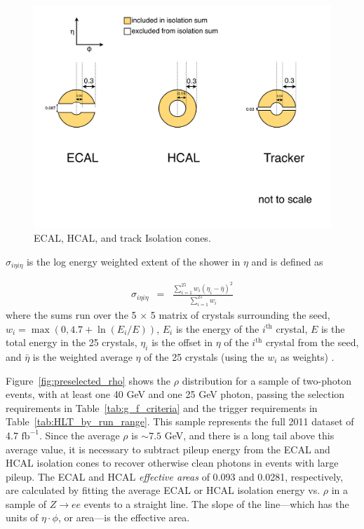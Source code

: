 \documentclass[dissertation.tex]{subfiles}
\begin{document}
\begin{figure}
	\centering
	\includegraphics[scale=0.3]{isolation_cones}
	\caption{ECAL, HCAL, and track Isolation cones.}
	\label{fig:isolation_cones}
\end{figure}

$\sigma_{i\eta i\eta}$ is the log energy weighted extent of the shower in $\eta$ and is defined as

\begin{eqnarray}
\sigma_{i\eta i\eta} &=& \frac{\sum_{i = 1}^{25}w_{i}(\eta_{i} - \bar{\eta})^{2}}{\sum_{i = 1}^{25}w_{i}}
\end{eqnarray}
%
where the sums run over the 5 $\times$ 5 matrix of crystals surrounding the seed, $w_{i} = \max(0, 4.7 + \ln(E_{i}/E))$, $E_{i}$ is the energy of the $i^{\mathrm{th}}$ crystal, $E$ is the total energy in the 25 crystals, $\eta_{i}$ is the offset in $\eta$ of the $i^{\mathrm{th}}$ crystal from the seed, and $\bar{\eta}$ is the weighted average $\eta$ of the 25 crystals (using the $w_{i}$ as weights) \cite{CMS-QCD-10-019}.

Figure~\ref{fig:preselected_rho} shows the $\rho$ distribution for a sample of two-photon events, with at least one 40 GeV and one 25 GeV photon, passing the selection requirements in Table~\ref{tab:g_f_criteria} and the trigger requirements in Table~\ref{tab:HLT_by_run_range}.  This sample represents the full 2011 dataset of 4.7 $\mbox{fb}^{-1}$.  Since the average $\rho$ is $\sim 7.5$ GeV, and there is a long tail above this average value, it is necessary to subtract pileup energy from the ECAL and HCAL isolation cones to recover otherwise clean photons in events with large pileup.  The ECAL and HCAL \textit{effective areas} of 0.093 and 0.0281, respectively, are calculated by fitting the average ECAL or HCAL isolation energy vs. $\rho$ in a sample of $Z\rightarrow ee$ events to a straight line.  The slope of the line---which has the units of $\eta\cdot\phi$, or area---is the effective area.
\end{document}
